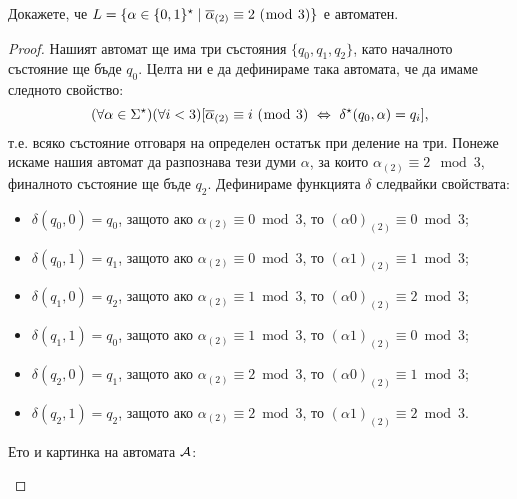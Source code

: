 \begin{problem}
  Докажете, че $L = \{\alpha \in \{0,1\}^\star \mid \overline{\alpha}_{(2)} \equiv 2\ (\bmod\ 3)\}$ е автоматен.
\end{problem}
\begin{proof}
  Нашият автомат ще има три състояния $\{q_0,q_1,q_2\}$, като началното състояние ще бъде $q_0$.
  Целта ни е да дефинираме така автомата, че да имаме следното свойство:
  \begin{equation}
    (\forall\alpha\in\Sigma^\star)(\forall i < 3)[\ov{\alpha}_{(2)} \equiv i\ (\bmod\ 3)\ \Leftrightarrow\ \delta^\star(q_0,\alpha) = q_i],
  \end{equation}
  т.е. всяко състояние отговаря на определен остатък при деление на три.
  Понеже искаме нашия автомат да разпознава тези думи $\alpha$,
  за които $\alpha_{(2)} \equiv 2\mod 3$, финалното състояние ще бъде $q_2$.
  Дефинираме функцията $\delta$ следвайки свойствата:
  \begin{itemize}
  \item
    $\delta(q_0,0) = q_0$, защото ако $\alpha_{(2)} \equiv 0 \bmod 3$, то $(\alpha0)_{(2)} \equiv 0 \bmod 3$;
  \item 
    $\delta(q_0,1) = q_1$, защото ако $\alpha_{(2)} \equiv 0 \bmod 3$, то $(\alpha1)_{(2)} \equiv 1 \bmod 3$;
  \item
    $\delta(q_1,0) = q_2$, защото ако $\alpha_{(2)} \equiv 1 \bmod 3$, то $(\alpha0)_{(2)} \equiv 2 \bmod 3$;
  \item 
    $\delta(q_1,1) = q_0$, защото ако $\alpha_{(2)} \equiv 1 \bmod 3$, то $(\alpha1)_{(2)} \equiv 0 \bmod 3$;
  \item
    $\delta(q_2,0) = q_1$, защото ако $\alpha_{(2)} \equiv 2 \bmod 3$, то $(\alpha0)_{(2)} \equiv 1 \bmod 3$;
  \item 
    $\delta(q_2,1) = q_2$, защото ако $\alpha_{(2)} \equiv 2 \bmod 3$, то $(\alpha1)_{(2)} \equiv 2 \bmod 3$.
  \end{itemize}
  Ето и картинка на автомата $\mathcal{A}$:
  \begin{framed}
  \begin{figure}[H]
    \begin{center}
\end{center}
\end{figure}
\end{framed}
\end{proof}
